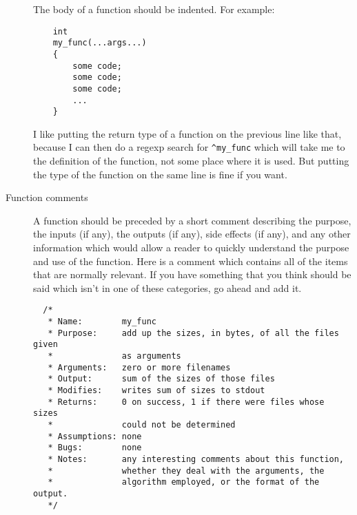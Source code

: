 \begin{description}
    The body of a function should be indented.  For example:
\begin{verbatim}
    int
    my_func(...args...)
    {
        some code;
        some code;
        some code;
        ...
    }
\end{verbatim}
    I like putting the return type of a function on the previous line
    like that, because I can then do a regexp search for
        \verb|^my_func|
    which will take me to the definition of the function, not some
    place where it is used.  But putting the type of the function on
    the same line is fine if you want.
    \clearpage
\item[Function comments] \hfill

    A function should be preceded by a short comment describing the
    purpose, the inputs (if any), the outputs (if any), side effects
    (if any), and any other information which would allow a reader to
    quickly understand the purpose and use of the function.  Here is a
    comment which contains all of the items that are normally relevant.
    If you have something that you think should be said which isn't
    in one of these categories, go ahead and add it.
\begin{verbatim}
  /*
   * Name:        my_func
   * Purpose:     add up the sizes, in bytes, of all the files given
   *              as arguments
   * Arguments:   zero or more filenames
   * Output:      sum of the sizes of those files
   * Modifies:    writes sum of sizes to stdout
   * Returns:     0 on success, 1 if there were files whose sizes 
   *              could not be determined
   * Assumptions: none
   * Bugs:        none
   * Notes:       any interesting comments about this function,
   *              whether they deal with the arguments, the 
   *              algorithm employed, or the format of the output.
   */
\end{verbatim}
\end{description}
